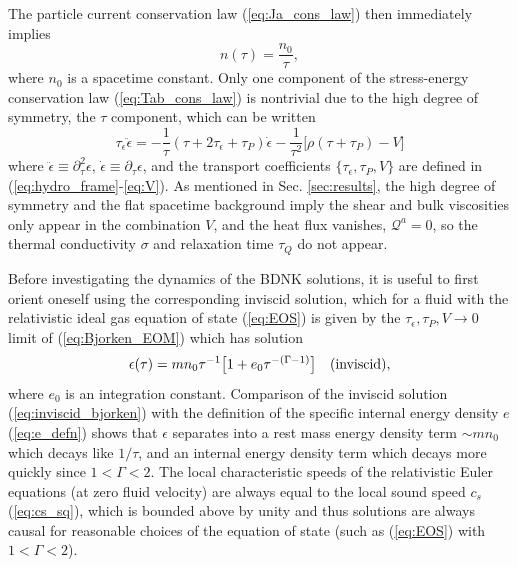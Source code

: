 \documentclass[%
notitlepage,
superscriptaddress,
nofootinbib,
amsmath,
amssymb,
aps,
twocolumn
]{revtex4-1}
\begin{document}
The particle current conservation law (\ref{eq:Ja_cons_law}) then immediately implies
\begin{equation}
n(\tau) = \frac{n_0}{\tau},
\end{equation}
where $n_0$ is a spacetime constant.  Only one component of the stress-energy conservation law (\ref{eq:Tab_cons_law}) is nontrivial due to the high degree of symmetry, the $\tau$ component, which can be written
\begin{equation} \label{eq:Bjorken_EOM}
\tau_{\epsilon} \ddot{\epsilon} = -\frac{1}{\tau} (\tau + 2 \tau_{\epsilon} + \tau_{P}) \dot{\epsilon} - \frac{1}{\tau^2} \big[ \rho (\tau+\tau_{P}) - V \big]
\end{equation}
where $\ddot{\epsilon} \equiv \partial_{\tau}^{2} \epsilon$, $\dot{\epsilon} \equiv \partial_{\tau} \epsilon$, and the transport coefficients $\{\tau_{\epsilon}, \tau_{P}, V\}$ are defined in (\ref{eq:hydro_frame}-\ref{eq:V}).  As mentioned in Sec. \ref{sec:results}, the high degree of symmetry and the flat spacetime background imply the shear and bulk viscosities only appear in the combination $V$, and the heat flux vanishes, $\mathcal{Q}^{a} = 0$, so the thermal conductivity $\sigma$ and relaxation time $\tau_{Q}$ do not appear.

Before investigating the dynamics of the BDNK solutions, it is useful to first orient oneself using the corresponding inviscid solution, which for a fluid with the relativistic ideal gas equation of state (\ref{eq:EOS}) is given by the $\tau_{\epsilon}, \tau_{P}, V \to 0$ limit of (\ref{eq:Bjorken_EOM}) which has solution
\begin{equation} \label{eq:inviscid_bjorken}
\epsilon(\tau) = m n_0 \tau^{-1} \big[ 1 + e_0 \tau^{-(\Gamma - 1)} \big] ~~~ \textnormal{(inviscid)},
\end{equation}
where $e_0$ is an integration constant. Comparison of the inviscid solution
(\ref{eq:inviscid_bjorken}) with the definition of the specific internal
energy density $e$ (\ref{eq:e_defn}) shows that $\epsilon$ separates into a
rest mass energy density term $\sim m n_0$ which decays like $1/\tau$, and
an internal energy density term which decays more quickly since $1 < \Gamma
< 2$.  The local characteristic speeds of the relativistic Euler equations
(at zero fluid velocity) are always equal to the local sound speed
$c_s$ (\ref{eq:cs_sq}), which is bounded above by unity and thus solutions
are always causal for reasonable choices of the equation of state (such as
(\ref{eq:EOS}) with $1 < \Gamma < 2$). 
\end{document}
